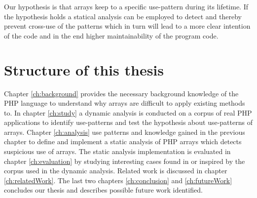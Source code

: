 Our hypothesis is that arrays keep to a specific use-pattern during its lifetime. If the hypothesis holds a statical analysis can be employed to detect and thereby prevent cross-use of the patterns which in turn will lead to a more clear intention of the code and in the end higher maintainability of the program code.

\section{Structure of this thesis}
Chapter \ref{ch:background} provides the necessary background knowledge of the PHP language to understand why arrays are difficult to apply existing methods to. In chapter \ref{ch:study} a dynamic analysis is conducted on a corpus of real PHP applications to identify use-patterns and test the hypothesis about use-patterns of arrays. Chapter \ref{ch:analysis} use patterns and knowledge gained in the previous chapter to define and implement a static analysis of PHP arrays which detects suspicious use of arrays. The static analysis implementation is evaluated in chapter \ref{ch:evaluation} by studying interesting cases found in or inspired by the corpus used in the dynamic analysis. Related work is discussed in chapter \ref{ch:relatedWork}. The last two chapters \ref{ch:conclusion} and \ref{ch:futureWork} concludes our thesis and describes possible future work identified.
